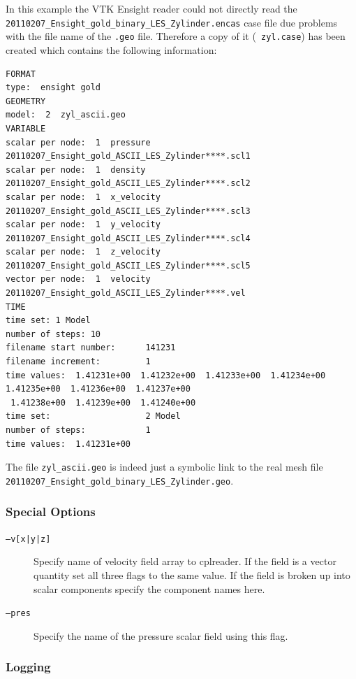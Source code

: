 \documentclass[a4paper,10pt]{article}
\begin{document}
In  this example  the VTK  Ensight  reader could  not directly  read the  {\tt
20110207\_Ensight\_gold\_binary\_LES\_Zylinder.encas}  case file  due problems
with  the file  name of  the {\tt  .geo} file.  Therefore a  copy of  it ({\tt
zyl.case}) has been created which contains the following information:

\begin{verbatim}
FORMAT
type:  ensight gold
GEOMETRY
model:  2  zyl_ascii.geo
VARIABLE
scalar per node:  1  pressure                  20110207_Ensight_gold_ASCII_LES_Zylinder****.scl1
scalar per node:  1  density                   20110207_Ensight_gold_ASCII_LES_Zylinder****.scl2
scalar per node:  1  x_velocity                20110207_Ensight_gold_ASCII_LES_Zylinder****.scl3
scalar per node:  1  y_velocity                20110207_Ensight_gold_ASCII_LES_Zylinder****.scl4
scalar per node:  1  z_velocity                20110207_Ensight_gold_ASCII_LES_Zylinder****.scl5
vector per node:  1  velocity                  20110207_Ensight_gold_ASCII_LES_Zylinder****.vel
TIME
time set: 1 Model
number of steps: 10
filename start number:      141231
filename increment:         1
time values:  1.41231e+00  1.41232e+00  1.41233e+00  1.41234e+00  1.41235e+00  1.41236e+00  1.41237e+00 
 1.41238e+00  1.41239e+00  1.41240e+00 
time set:                   2 Model
number of steps:            1
time values:  1.41231e+00
\end{verbatim}

The file {\tt zyl\_ascii.geo} is indeed  just a symbolic link to the real mesh
file {\tt 20110207\_Ensight\_gold\_binary\_LES\_Zylinder.geo}.

\subsubsection{Special Options}

\begin{description}
  \item[{\tt   --v[x|y|z]}]  Specify   name   of  velocity   field  array   to
cplreader. If the field  is a vector quantity set all three  flags to the same
value. If the field is broken  up into scalar components specify the component
names here.

  \item[{\tt --pres}] Specify the name of the pressure scalar field using this
flag.
\end{description}


\subsubsection{Logging} 
\end{document}
